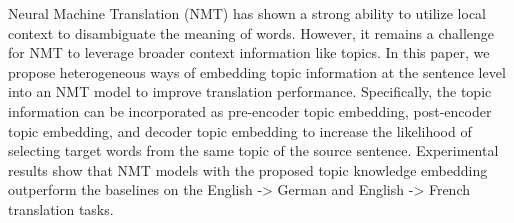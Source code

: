 Neural Machine Translation (NMT) has shown a strong ability to utilize local context to disambiguate the meaning of words. However, it remains a challenge for NMT to leverage broader context information like topics. In this paper, we propose heterogeneous ways of embedding topic information at the sentence level into an NMT model to improve translation performance. Specifically, the topic information can be incorporated as pre-encoder topic embedding, post-encoder topic embedding, and decoder topic embedding to increase the likelihood of selecting target words from the same topic of the source sentence. Experimental results show that NMT models with the proposed topic knowledge embedding outperform the baselines on the English -> German and English -> French translation tasks.
